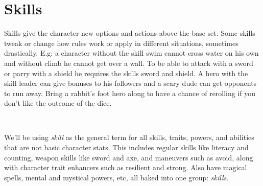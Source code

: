 





\cleardoublepage

\chapter*{Skills}

Skills give the character new options and actions above the base set. Some skills tweak or change how rules work or apply in different situations, sometimes drastically. E.g: a character without the skill swim cannot cross water on his own and without climb he cannot get over a wall. To be able to attack with a sword or parry with a shield he requires the skills sword and shield. A hero with the skill leader can give bonuses to his followers and a scary dude can get opponents to run away. Bring a rabbit's foot hero along to have a chance of rerolling if you don't like the outcome of the dice.

\

We'll be using \emph{skill} as the general term for all skills, traits, powers, and abilities that are not basic character stats. This includes regular skills like literacy and counting, weapon skills like sword and axe, and maneuvers such as avoid, along with character trait enhancers such as resilient and strong. Also have magical spells, mental and mystical powers, etc, all baked into one group: \emph{skills}.

\

